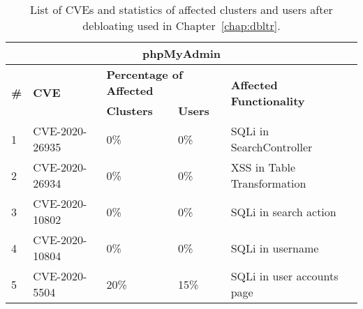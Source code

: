 
\begin{table}[]
    \caption{List of CVEs and statistics of affected clusters and users after debloating used in Chapter~\ref{chap:dbltr}.}
    \label{tab:cve_details}
    \centering
    \begin{adjustbox}{max width=0.65\textwidth}
    \begin{tabular}{|lllll|}
    \hline
    \multicolumn{5}{|c|}{\textbf{phpMyAdmin}}                                                                                                                                                                                                 \\ \hline
    \multicolumn{1}{|l|}{\multirow{2}{*}{\textbf{\#}}} & \multicolumn{1}{l|}{\multirow{2}{*}{\textbf{CVE}}} & \multicolumn{2}{l|}{\textbf{Percentage of Affected}}                         & \multirow{2}{*}{\textbf{Affected Functionality}} \\ \cline{3-4}
    \multicolumn{1}{|l|}{}            & \multicolumn{1}{l|}{}                 & \multicolumn{1}{l|}{\textbf{Clusters}} & \multicolumn{1}{l|}{\textbf{Users}} &                                 \\ \hline
    \multicolumn{1}{|l|}{1}           & \multicolumn{1}{l|}{CVE-2020-26935}   & \multicolumn{1}{l|}{0\%}                  & \multicolumn{1}{l|}{0\%}               & SQLi in SearchController        \\ \hline
    \multicolumn{1}{|l|}{2}           & \multicolumn{1}{l|}{CVE-2020-26934}   & \multicolumn{1}{l|}{0\%}                  & \multicolumn{1}{l|}{0\%}               & XSS in Table Transformation     \\ \hline
    \multicolumn{1}{|l|}{3}           & \multicolumn{1}{l|}{CVE-2020-10802}   & \multicolumn{1}{l|}{0\%}                  & \multicolumn{1}{l|}{0\%}               & SQLi in search action           \\ \hline
    \multicolumn{1}{|l|}{4}           & \multicolumn{1}{l|}{CVE-2020-10804}   & \multicolumn{1}{l|}{0\%}                  & \multicolumn{1}{l|}{0\%}               & SQLi in username                \\ \hline
    \multicolumn{1}{|l|}{5}           & \multicolumn{1}{l|}{CVE-2020-5504}    & \multicolumn{1}{l|}{20\%}                 & \multicolumn{1}{l|}{15\%}              & SQLi in user accounts page      \\ \hline

\end{tabular}
\end{adjustbox}
\end{table}
